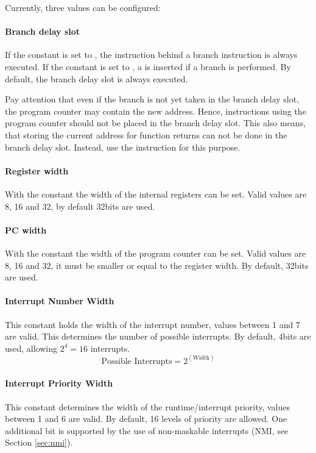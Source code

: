 Currently, three values can be configured:
\paragraph{Branch delay slot}
\label{sec:branchdelayslot}
If the constant  is set to , the instruction behind a branch instruction is always executed.
If the constant is set to , a  is inserted if a branch is performed.
By default, the branch delay slot is always executed.

Pay attention that even if the branch is not yet taken in the branch delay slot, the program counter may contain the new address.
Hence, instructions using the program counter should not be placed in the branch delay slot.
This also means, that storing the current address for function returns can not be done in the branch delay slot.
Instead, use the  instruction for this purpose.
\paragraph{Register width}
With the constant  the width of the internal registers can be set. Valid values are 8, 16 and 32, by default 32bits are used.
\paragraph{PC width}
With the constant  the width of the program counter can be set.
Valid values are 8, 16 and 32, it must be smaller or equal to the register width.
By default, 32bits are used.
\paragraph{Interrupt Number Width}
This constant holds the width of the interrupt number, values between 1 and 7 are valid.
This determines the number of possible interrupts.
By default, 4bits are used, allowing $2^4 = 16$ interrupts. 
\begin{equation*}
\text{Possible Interrupts} = 2^{(\text{Width})}
\end{equation*}
\paragraph{Interrupt Priority Width}
\label{sec:config_priowidth}
This constant determines the width of the runtime/interrupt priority, values between 1 and 6 are valid.
By default, 16 levels of priority are allowed.
One additional bit is supported by the use of non-maskable interrupts (NMI, see Section \ref{sec:nmi}).

